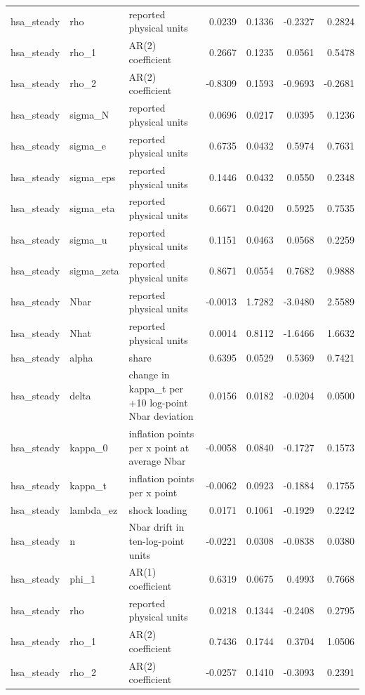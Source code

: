 \begin{tabular}{lllrrrr}
hsa\_steady & rho & reported physical units & 0.0239 & 0.1336 & -0.2327 & 0.2824 \\
hsa\_steady & rho\_1 & AR(2) coefficient & 0.2667 & 0.1235 & 0.0561 & 0.5478 \\
hsa\_steady & rho\_2 & AR(2) coefficient & -0.8309 & 0.1593 & -0.9693 & -0.2681 \\
hsa\_steady & sigma\_N & reported physical units & 0.0696 & 0.0217 & 0.0395 & 0.1236 \\
hsa\_steady & sigma\_e & reported physical units & 0.6735 & 0.0432 & 0.5974 & 0.7631 \\
hsa\_steady & sigma\_eps & reported physical units & 0.1446 & 0.0432 & 0.0550 & 0.2348 \\
hsa\_steady & sigma\_eta & reported physical units & 0.6671 & 0.0420 & 0.5925 & 0.7535 \\
hsa\_steady & sigma\_u & reported physical units & 0.1151 & 0.0463 & 0.0568 & 0.2259 \\
hsa\_steady & sigma\_zeta & reported physical units & 0.8671 & 0.0554 & 0.7682 & 0.9888 \\
hsa\_steady & Nbar & reported physical units & -0.0013 & 1.7282 & -3.0480 & 2.5589 \\
hsa\_steady & Nhat & reported physical units & 0.0014 & 0.8112 & -1.6466 & 1.6632 \\
hsa\_steady & alpha & share & 0.6395 & 0.0529 & 0.5369 & 0.7421 \\
hsa\_steady & delta & change in kappa\_t per +10 log-point Nbar deviation & 0.0156 & 0.0182 & -0.0204 & 0.0500 \\
hsa\_steady & kappa\_0 & inflation points per x point at average Nbar & -0.0058 & 0.0840 & -0.1727 & 0.1573 \\
hsa\_steady & kappa\_t & inflation points per x point & -0.0062 & 0.0923 & -0.1884 & 0.1755 \\
hsa\_steady & lambda\_ez & shock loading & 0.0171 & 0.1061 & -0.1929 & 0.2242 \\
hsa\_steady & n & Nbar drift in ten-log-point units & -0.0221 & 0.0308 & -0.0838 & 0.0380 \\
hsa\_steady & phi\_1 & AR(1) coefficient & 0.6319 & 0.0675 & 0.4993 & 0.7668 \\
hsa\_steady & rho & reported physical units & 0.0218 & 0.1344 & -0.2408 & 0.2795 \\
hsa\_steady & rho\_1 & AR(2) coefficient & 0.7436 & 0.1744 & 0.3704 & 1.0506 \\
hsa\_steady & rho\_2 & AR(2) coefficient & -0.0257 & 0.1410 & -0.3093 & 0.2391 \\

\end{tabular}
